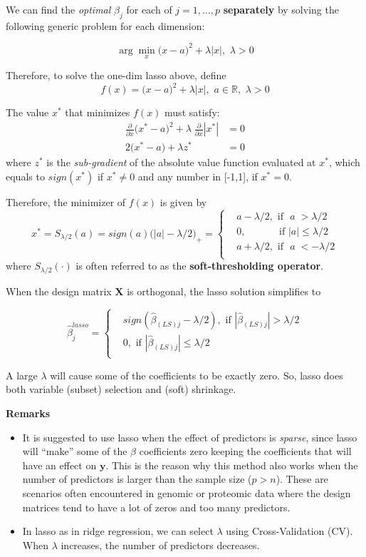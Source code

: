 \documentclass[
]{book}
\begin{document}
We can find the \emph{optimal} \(\beta_j\) for each of \(j=1, \ldots, p\) \textbf{separately} by solving the following generic problem for each dimension:

\[\arg \min_{x} \bigl( x-a \bigr )^2 + \lambda |x|,\,\, \lambda >0\]

Therefore, to solve the one-dim lasso above, define
\[f(x)  = \bigl( x-a \bigr )^2 + \lambda |x|,\,\, a\in\mathbb{R},\,\,\lambda >0\]

The value \(x^*\) that minimizes \(f(x)\) must satisfy:
\begin{align*}
\frac{\partial}{\partial x} \bigl(x^* - a \bigr)^2 + \lambda \;\frac{\partial}{\partial x} |x^*| & = 0\\
2\bigl(x^* - a \bigr) +\lambda z^* &= 0
\end{align*}
where \(z^*\) is the \emph{sub-gradient} of the absolute value function evaluated at \(x^*\), which equals to \(sign(x^*)\) if \(x^*\neq 0\) and any number in {[}-1,1{]}, if \(x^*=0\).

Therefore, the minimizer of \(f(x)\) is given by
\[x^* = S_{\lambda/2}(a) = sign(a) \bigl(|a|-\lambda/2 \bigr)_{+} = 
\begin{cases}
& a-\lambda/2,  \text{ if } \,\,  a \; >\lambda/2\\
& 0, \qquad \quad \text{ if } |a| \leq \lambda/2\\
& a+\lambda/2,  \text{ if } \,\,  a \; < -\lambda/2\\
\end{cases}
\]
where \(S_{\lambda/2}(\cdot)\) is often referred to as the \textbf{soft-thresholding operator}.

When the design matrix \(\mathbf{X}\) is orthogonal, the lasso solution simplifies to

\[\hat{\beta}_{j}^{lasso} = \begin{cases}
& sign (\hat{\beta}_{(LS)j} - \lambda/2), \text{ if }|\hat{\beta}_{(LS)j}| > \lambda/2\\
& 0, \text{ if }|\hat{\beta}_{(LS)j}| \leq \lambda/2\\
\end{cases}
\]

A large \(\lambda\) will cause some of the coefficients to be exactly zero. So, lasso does both variable (subset) selection and (soft) shrinkage.

\textbf{Remarks}

\begin{itemize}
\item
  It is suggested to use lasso when the effect of predictors is \emph{sparse}, since lasso will ``make'' some of the \(\beta\) coefficients zero keeping the coefficients that will have an effect on \(\mathbf{y}\). This is the reason why this method also works when the number of predictors is larger than the sample size (\(p>n\)). These are scenarios often encountered in genomic or proteomic data where the design matrices tend to have a lot of zeros and too many predictors.
\item
  In lasso as in ridge regression, we can select \(\lambda\) using Cross-Validation (CV). When \(\lambda\) increases, the number of predictors decreases.
\end{itemize}
\end{document}
